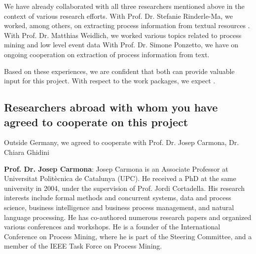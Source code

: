 We have already collaborated with all three researchers mentioned above in the context of various research efforts. 
With Prof. Dr. Stefanie Rinderle-Ma, we worked, among others, on extracting process information from textual resources \cite{winter2020assessing}. 
With Prof. Dr. Matthias Weidlich, we worked various topics related to process mining \cite{} and low level event data \cite{}
With Prof. Dr. Simone Ponzetto, we have on ongoing cooperation on extraction of process information from text.

Based on these experiences, we are confident that both can provide valuable input for this project. With respect to the work packages, we expect .


\subsection{Researchers abroad with whom you have agreed to cooperate on this project}
\label{sec:collab:abroad}

Outside Germany, we agreed to cooperate with Prof. Dr. Josep Carmona, Dr. Chiara Ghidini


\textbf{Prof. Dr. Josep Carmona}: Josep Carmona is an Associate Professor at Universitat Politècnica de Catalunya (UPC). He received a PhD at the same university in 2004, under the supervision of Prof. Jordi Cortadella. His research interests include formal methods and concurrent systems, data and process science, business intelligence and business process management, and natural language processing. He has co-authored numerous research papers and organized various conferences and workshops. He is a founder of the International Conference on Process Mining, where he is part of the Steering Committee, and a member of the IEEE Task Force on Process Mining.



